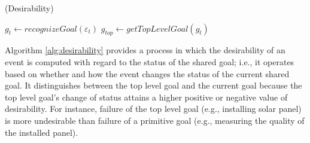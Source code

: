 \documentclass[12pt]{report}
\begin{document}
\begin{algorithm}[tbh]
	\caption{(Desirability)}
	\label{alg:desirability}
	\begin{algorithmic}[1]
			\Statex
			\State $\mathit{g}_{t} \gets \textit{recognizeGoal}{(\varepsilon_t)}$
			\State $\mathit{g}_{top} \gets \textit{getTopLevelGoal}{(\mathit{g}_{t})}$
			\Statex
			\State {} 
			\State {}
			\State {} 
				\Statex
				\State {}
				\State {}
				\State {}
				\State {}
				\EndIf
			\EndIf
		\EndFunction
	\end{algorithmic}
\end{algorithm}

Algorithm \ref{alg:desirability} provides a process in which the desirability of
an event is computed with regard to the status of the shared goal; i.e., it
operates based on whether and how the event changes the status of the current
shared goal. It distinguishes between the top level goal and the current goal
because the top level goal's change of status attains a higher positive or
negative value of desirability. For instance, failure of the top level goal
(e.g., installing solar panel) is more undesirable than failure of a primitive
goal (e.g., measuring the quality of the installed panel).
\end{document}
